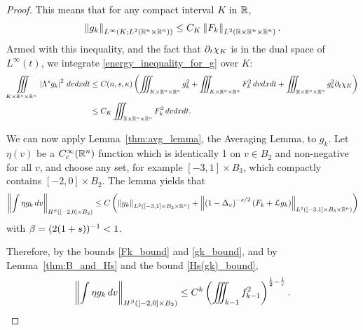 \begin{proof}
This means that for any compact interval $K$ in $\mathbb{R}$,
\begin{equation}\label{gk_bound}
\left\lVert g_k\right\rVert_{L^\infty(K; L^2(\mathbb{R}^n\times \mathbb{R}^n))} \leq C_K \left\lVert F_k\right\rVert_{L^2(\mathbb{R}\times\mathbb{R}^n\times\mathbb{R}^n)}. 
\end{equation}
Armed with this inequality, and the fact that $\partial_t \chi_K$ is in the dual space of $L^\infty(t)$, we integrate \eqref{energy_inequality_for_g} over $K$:
\begin{align} 
\iiint\displaylimits_{K \times \mathbb{R}^n \times \mathbb{R}^n} \left\lvert \Lambda^s g_k \right\rvert^2 \,dvdxdt &\leq C(n,s,\kappa) \left(  \iiint_{K \times \mathbb{R}^n \times \mathbb{R}^n} g_k^2 + \iiint_{K \times \mathbb{R}^n \times \mathbb{R}^n} F_k^2 \,dvdxdt + \iiint_{\mathbb{R} \times \mathbb{R}^n \times \mathbb{R}^n} g_k^2 \partial_t \chi_K \right) \nonumber
\\ &\leq C_K \iiint_{\mathbb{R}\times\mathbb{R}^n\times\mathbb{R}^n} F_k^2 \,dvdxdt. \label{Hs(gk)_bound}
\end{align} 
%
%
%
%

We can now apply Lemma~\ref{thm:avg_lemma}, the Averaging Lemma, to $g_k$.  Let $\eta(v)$ be a $C_c^\infty(\mathbb{R}^n)$ function which is identically 1 on $v \in B_2$ and non-negative for all $v$, and choose any set, for example $[-3,1]\times B_3$, which compactly contains $[-2,0]\times B_2$.  The lemma yields that
\begin{equation*}
\left\lVert\int \eta g_k \,dv\right\rVert_{H^\beta([-2,0]\times B_2)} \leq C\left( \left\lVert g_k\right\rVert_{L^2([-3,1]\times B_3 \times \mathbb{R}^n)} + \left\lVert\left( 1-\Delta_v \right)^{-s/2}\left( F_k + \mathcal{L} g_k \right)\right\rVert_{L^2([-3,1]\times B_3 \times \mathbb{R}^n)} \right) 
\end{equation*}
with $\beta = (2(1+s))^{-1} < 1$.  

Therefore, by the bounds \eqref{Fk_bound} and \eqref{gk_bound}, and by Lemma~\ref{thm:B_and_Hs} and the bound \eqref{Hs(gk)_bound},
\begin{equation}\label{bezard_result}
\left\lVert\int \eta g_k \,dv\right\rVert_{H^\beta([-2,0]\times B_2)} \leq C^k \left( \iiint_{k-1} f_{k-1}^2 \right)^{\frac{1}{2} - \frac{1}{{r}}}. 
\end{equation}


\end{proof}
